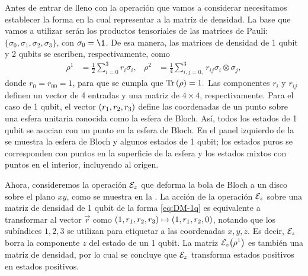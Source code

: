 Antes de entrar de lleno con la operación que vamos 
a considerar necesitamos establecer la forma en la 
cual representar a la matriz de densidad. La base
que vamos a utilizar serán los productos tensoriales de
las matrices de Pauli: $\{ \sigma_0, \sigma_1, \sigma_2, \sigma_3\}$,
con $\sigma_0=\1$. De esa manera, las matrices de 
densidad de 1 qubit y 2 qubits se escriben, 
respectivamente, como~\cite{nielsen_chuang_2011}
\begin{align}
\rho^1&=\frac{1}{2}\sum_{i=0}^{3} r_i\sigma_i,
& 
\rho^2&=\frac{1}{4}\sum _{i,j=0, }^{3}r_{ij}\sigma_i\otimes\sigma_j,
\label{eq:DM-1q}
\end{align}
donde $r_0=r_{00}=1$, para que se cumpla que $\Tr\qty(\rho)=1.$
Las componentes $r_i$ y $r_{ij}$ definen un vector de 4 entradas
y una matriz de $4\times4$, respectivamente. 
Para el caso de 1 qubit, el vector $\qty(r_1, r_2, r_3)$ define 
las coordenadas de un punto sobre una esfera unitaria conocida
como la esfera de Bloch.
Así, todos los estados de 1 qubit se asocian con un punto en la
esfera de Bloch. En el panel izquierdo de la 
 se muestra la esfera de Bloch
y algunos estados de 1 qubit; los estados puros se corresponden
con puntos en la superficie de la esfera y los estados mixtos 
con puntos en el interior, incluyendo al origen.

Ahora, consideremos la operación $\mathcal{E}_z$ que deforma la bola de Bloch a un 
disco sobre el plano $xy$, como se muestra en la . 
La acción de la operación $\mathcal{E}_z$ sobre una matriz de densidad
de 1 qubit 
de la forma \eqref{eq:DM-1q} es equivalente a 
transformar al vector $\vec{r}$ como 
$\qty(1,r_1,r_2,r_3)\mapsto\qty(1,r_1,r_2,0)$,
notando que los subíndices $1,2,3$ se utilizan para
etiquetar a las coordenadas $x,y,z$. 
Es decir, $\mathcal{E}_z$ borra la componente $z$ del estado de un 1 qubit.
La matriz $\mathcal{E}_z\qty(\rho^1)$ es también una matriz de densidad, 
por lo cual se concluye que $\mathcal{E}_z$ transforma estados 
positivos en estados positivos.

